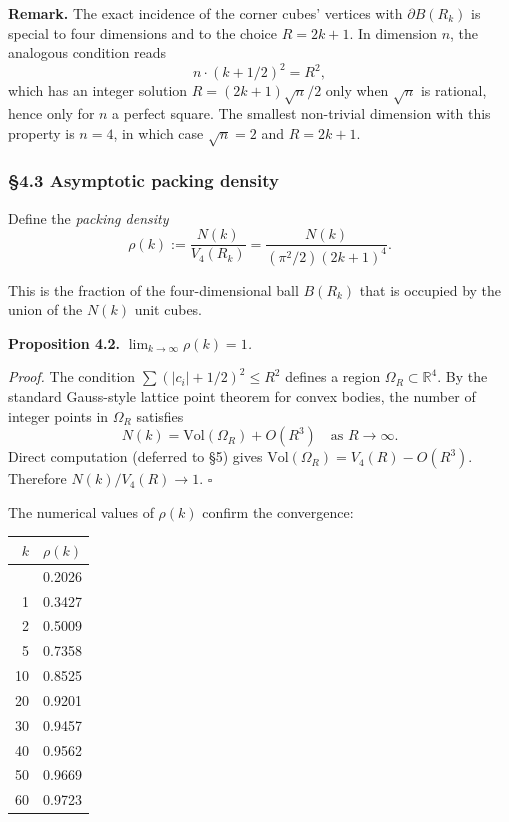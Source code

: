 \documentclass[a4paper,11pt]{article}
\theoremstyle{definition}
\begin{document}
\textbf{Remark.} The exact incidence of the corner cubes' vertices with
\(\partial B(R_k)\) is special to four dimensions and to the choice
\(R = 2k+1\). In dimension \(n\), the analogous condition reads
\[n \cdot (k + 1/2)^2 = R^2,\] which has an integer solution
\(R = (2k+1) \sqrt{n}/2\) only when \(\sqrt{n}\) is rational, hence only
for \(n\) a perfect square. The smallest non-trivial dimension with this
property is \(n = 4\), in which case \(\sqrt{n} = 2\) and \(R = 2k+1\).

\subsubsection{§4.3 Asymptotic packing
density}\label{asymptotic-packing-density}

Define the \emph{packing density}
\[\rho(k) := \frac{N(k)}{V_4(R_k)} = \frac{N(k)}{(\pi^2/2) (2k+1)^4}.\]

This is the fraction of the four-dimensional ball \(B(R_k)\) that is
occupied by the union of the \(N(k)\) unit cubes.

\textbf{Proposition 4.2.} \emph{\(\lim_{k \to \infty} \rho(k) = 1\).}

\emph{Proof.} The condition \(\sum (|c_i| + 1/2)^2 \le R^2\) defines a
region \(\Omega_R \subset \mathbb{R}^4\). By the standard Gauss-style
lattice point theorem for convex bodies, the number of integer points in
\(\Omega_R\) satisfies
\[N(k) = \mathrm{Vol}(\Omega_R) + O(R^3) \quad \text{as } R \to \infty.\]
Direct computation (deferred to §5) gives
\(\mathrm{Vol}(\Omega_R) = V_4(R) - O(R^3)\). Therefore
\(N(k) / V_4(R) \to 1\). \(\square\)

The numerical values of \(\rho(k)\) confirm the convergence:

{\def\LTcaptype{none} %
\begin{longtable}[]{@{}rr@{}}
\toprule\noalign{}
\(k\) & \(\rho(k)\) \\
\midrule\noalign{}
\endhead
\bottomrule\noalign{}
\endlastfoot
0 & 0.2026 \\
1 & 0.3427 \\
2 & 0.5009 \\
5 & 0.7358 \\
10 & 0.8525 \\
20 & 0.9201 \\
30 & 0.9457 \\
40 & 0.9562 \\
50 & 0.9669 \\
60 & 0.9723 \\
\end{longtable}
}
\end{document}
